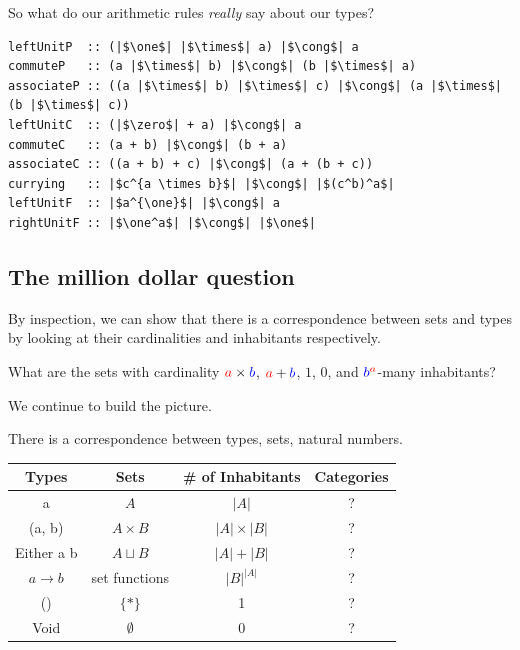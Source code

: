 \documentclass[tikz]{beamer}
\newcommand{\zero}{\bm{\mathbb{0}}}
\newcommand{\one}{\bm{\mathbb{1}}}
\newcommand{\red}[1]{\textcolor{red}{#1}}
\newcommand{\blue}[1]{\textcolor{blue}{#1}}
\theoremstyle{definition}
\begin{document}
\frame
{ 
	So what do our arithmetic rules \textit{really} say about our types?
}

\begin{frame}[fragile]
\begin{verbatim}
leftUnitP  :: (|$\one$| |$\times$| a) |$\cong$| a
commuteP   :: (a |$\times$| b) |$\cong$| (b |$\times$| a)
associateP :: ((a |$\times$| b) |$\times$| c) |$\cong$| (a |$\times$| (b |$\times$| c))
leftUnitC  :: (|$\zero$| + a) |$\cong$| a
commuteC   :: (a + b) |$\cong$| (b + a)
associateC :: ((a + b) + c) |$\cong$| (a + (b + c))
currying   :: |$c^{a \times b}$| |$\cong$| |$(c^b)^a$|
leftUnitF  :: |$a^{\one}$| |$\cong$| a
rightUnitF :: |$\one^a$| |$\cong$| |$\one$|
\end{verbatim}
\end{frame}

\subsection{The million dollar question}

\frame
{ 
	By inspection, we can show that there is a correspondence between sets and types by looking at their cardinalities and inhabitants respectively. 
}

\frame
{
	What are the sets with cardinality $\red{a} \times \blue{b}$, $\red{a} + \blue{b}$, $1$, $0$, and $\blue{b}^{\red{a}}$-many inhabitants? 
}

\frame
{
	We continue to build the picture.
}

\begin{frame}
There is a correspondence between types, sets, natural numbers.
\begin{center}
\begin{tabular}{|c|c|c|c|}
\hline
Types & Sets & \# of Inhabitants & Categories \\
\hline
a       & $A$ & $|A|$  & ? \\
(a, b) & $A \times B$ & $|A| \times |B|$ & ? \\
Either a b & $A \sqcup B$ & $|A| + |B|$ & ? \\
$a \to b$ &  set functions & $|B|^{|A|}$ & ? \\
() & $\{*\}$ & 1 & ? \\
Void & $\emptyset$ & 0 & ? \\ \hline
\end{tabular}
\end{center}
\end{frame}
\end{document}
